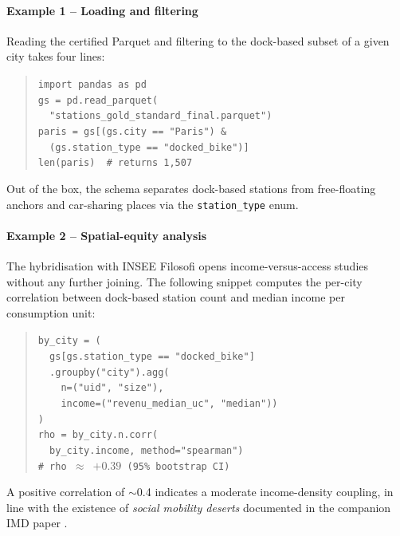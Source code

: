 \documentclass[a4paper,twoside]{article}
\begin{document}
\paragraph{Example 1 -- Loading and filtering}
Reading the certified Parquet and filtering to the dock-based
subset of a given city takes four lines:
\begin{quote}
\texttt{import pandas as pd}\\
\texttt{gs = pd.read\_parquet(}\\
\texttt{~~"stations\_gold\_standard\_final.parquet")}\\
\texttt{paris = gs[(gs.city == "Paris") \&}\\
\texttt{~~(gs.station\_type == "docked\_bike")]}\\
\texttt{len(paris)~~\#~returns~1,507}
\end{quote}
Out of the box, the schema separates dock-based stations from
free-floating anchors and car-sharing places via the
\texttt{station\_type} enum.

\paragraph{Example 2 -- Spatial-equity analysis}
The hybridisation with INSEE Filosofi opens income-versus-access
studies without any further joining. The following snippet
computes the per-city correlation between dock-based station
count and median income per consumption unit:
\begin{quote}
\texttt{by\_city = (}\\
\texttt{~~gs[gs.station\_type == "docked\_bike"]}\\
\texttt{~~.groupby("city").agg(}\\
\texttt{~~~~n=("uid", "size"),}\\
\texttt{~~~~income=("revenu\_median\_uc", "median"))}\\
\texttt{)}\\
\texttt{rho = by\_city.n.corr(}\\
\texttt{~~by\_city.income, method="spearman")}\\
\texttt{\#~rho~$\approx$~$+0.39$ (95\% bootstrap CI)}
\end{quote}
A positive correlation of $\sim$0.4 indicates a moderate
income-density coupling, in line with the existence of
\emph{social mobility deserts} documented in the companion IMD
paper \cite{Fosse2026imd}.
\end{document}
